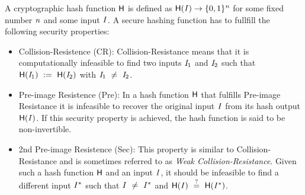 
\begin{definition}\label{def:hashFunction}
    A cryptographic hash function $\mathsf{H}$ is defined as $\mathsf{H} (\mathit{I}) \rightarrow \{0,1\}^{\mathit{n}}$ for some fixed number $\mathit{n}$ and some input $\mathit{I}$. A secure hashing function
    has to fullfill the following security properties:~\cite{al2011cryptographic}
    \begin{itemize}
        \item Collision-Resistence (CR): Collision-Resistance means that it is computationally infeasible to find two inputs $\mathit{I}_1$ and $\mathit{I}_2$ such that
        $\mathsf{H} (\mathit{I}_1) ~:=~ \mathsf{H} (\mathit{I}_2)$ with $\mathit{I}_1 ~\neq~ \mathit{I}_2$.
        \item Pre-image Resistence (Pre): In a hash function $\mathsf{H}$ that fulfills Pre-image Resistance it is infeasible to recover the original input $\mathit{I}$ from its hash output $\mathsf{H} (\mathit{I})$.
        If this security property is achieved, the hash function is said to be non-invertible.
        \item 2nd Pre-image Resistence (Sec):  This property is similar to Collision-Resistance and is sometimes referred to as \textit{Weak Collision-Resistance}.
        Given such a hash function $\mathsf{H}$ and an input $\mathit{I}$, it should be infeasible to find a different input $\mathit{I}^*$ such that $\mathit{I} ~\neq~ \mathit{I}^*$
        and $\mathsf{H} (\mathit{I}) ~\stackrel{?}{=}~ \mathsf{H} (\mathit{I}^*)$.
    \end{itemize}
\end{definition}


